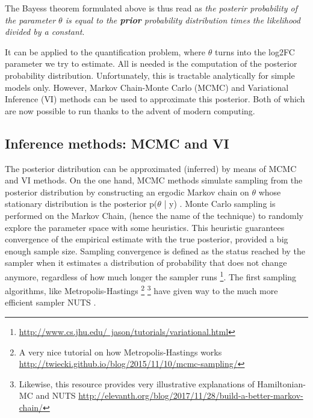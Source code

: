 The Bayes\textquotesingle s theorem formulated above is thus read as \textit{the posterir probability of the parameter $\theta$ is equal to the \textbf{prior} probability distribution times the likelihood divided by a constant}.

It can be applied to the quantification problem, where $\theta$ turns into the log2FC parameter we try to estimate. All is needed is the computation of the posterior probability distribution. Unfortunately, this is tractable analytically for simple models only. However, Markov Chain-Monte Carlo (\ac{MCMC}) and Variational Inference (\ac{VI}) methods can be used to approximate this posterior. Both of which are now possible to run thanks to the advent of modern computing.

\subsection{Inference methods: \ac{MCMC} and \ac{VI}}

The posterior distribution can be approximated (inferred) by means of \ac{MCMC} and \ac{VI} methods. On the one hand, \ac{MCMC} methods simulate sampling from the posterior distribution by constructing an ergodic Markov chain on $\theta$ whose stationary distribution is the posterior p($\theta$ | y) \cite{Blei2018}. Monte Carlo sampling is performed on the Markov Chain, (hence the name of the technique) to randomly explore the parameter space with some heuristics. This heuristic guarantees convergence of the empirical estimate with the true posterior, provided a big enough sample size. Sampling convergence is defined as the status reached by the sampler when it estimates a distribution of probability that does not change anymore, regardless of how much longer the sampler runs \cite{Tran2018} \footnote{\href{http://www.cs.jhu.edu/~jason/tutorials/variational.html}{http://www.cs.jhu.edu/~jason/tutorials/variational.html}}. The first sampling algorithms, like Metropolis-Hastings \cite{Chib1995} \footnote{A very nice tutorial on how Metropolis-Hastings works \href{http://twiecki.github.io/blog/2015/11/10/mcmc-sampling/}{http://twiecki.github.io/blog/2015/11/10/mcmc-sampling/}} \footnote{Likewise, this resource provides very illustrative explanations of Hamiltonian-MC and NUTS \href{http://elevanth.org/blog/2017/11/28/build-a-better-markov-chain/}{http://elevanth.org/blog/2017/11/28/build-a-better-markov-chain/}} have given way to the much more efficient sampler \ac{NUTS} \cite{Hoffman2011}.

